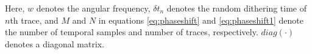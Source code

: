 Here, $w$ denotes the angular frequency, $\delta t_n$ denotes the random dithering time of $n$th trace, and $M$ and $N$ in equations \ref{eq:phaseshift} and \ref{eq:phaseshift1} denote the number of temporal samples and number of traces, respectively. $diag(\cdot)$ denotes a diagonal matrix. 

